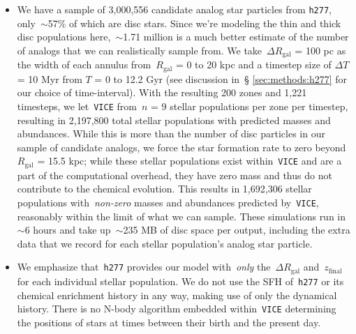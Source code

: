 \documentclass[fleqn, usenatbib]{mnras}
\begin{document}
\begin{itemize}
	\item We have a sample of 3,000,556 candidate analog star particles from 
	\texttt{h277}, only~$\sim$57\% of which are disc stars. Since we're 
	modeling the thin and thick disc populations here,~$\sim$1.71 million is a 
	much better estimate of the number of analogs that we can realistically 
	sample from. We take~$\Delta R_\text{gal}$ = 100 pc as the width of each 
	annulus from~$R_\text{gal}$ = 0 to 20 kpc and a timestep size of 
	$\Delta T$ = 10 Myr from $T$ = 0 to 12.2 Gyr (see discussion in~\S 
	\ref{sec:methods:h277} for our choice of time-interval). With the resulting 
	200 zones and 1,221 timesteps, we let~\texttt{VICE} from~$n$ = 9 stellar 
	populations per zone per timestep, resulting in 2,197,800 total stellar 
	populations with predicted masses and abundances. While this is more than 
	the number of disc particles in our sample of candidate analogs, we force 
	the star formation rate to zero beyond~$R_\text{gal}$ = 15.5 kpc; while 
	these stellar populations exist within~\texttt{VICE} and are a part of the 
	computational overhead, they have zero mass and thus do not contribute to 
	the chemical evolution. This results in 1,692,306 stellar populations 
	with~\textit{non-zero} masses and abundances predicted by~\texttt{VICE}, 
	reasonably within the limit of what we can sample. These simulations run in 
	$\sim$6 hours and take up~$\sim$235 MB of disc space per output, including 
	the extra data that we record for each stellar population's analog star 
	particle. 

	\item We emphasize that~\texttt{h277} provides our model with~\textit{only} 
	the~$\Delta R_\text{gal}$ and~$z_\text{final}$ for each individual stellar 
	population. We do not use the SFH of~\texttt{h277} or its chemical 
	enrichment history in any way, making use of only the dynamical history. 
	There is no N-body algorithm embedded within~\texttt{VICE} determining the 
	positions of stars at times between their birth and the present day. 
\end{itemize} 
\end{document}

